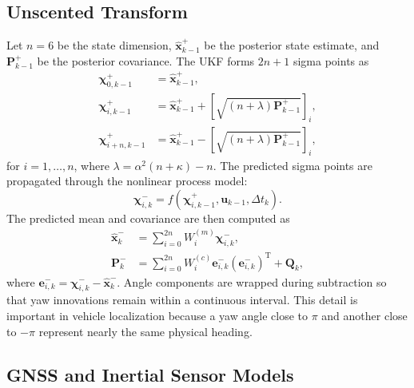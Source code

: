 \documentclass[conference]{IEEEtran}
\begin{document}
\subsection{Unscented Transform}

Let $n=6$ be the state dimension, $\hat{\mathbf{x}}_{k-1}^{+}$ be the posterior state estimate, and $\mathbf{P}_{k-1}^{+}$ be the posterior covariance. The UKF forms $2n+1$ sigma points as
\begin{align}
\boldsymbol{\chi}_{0,k-1}^{+} &= \hat{\mathbf{x}}_{k-1}^{+},
\label{eq:sigma0}\\
\boldsymbol{\chi}_{i,k-1}^{+} &= \hat{\mathbf{x}}_{k-1}^{+}
+ \left[\sqrt{(n+\lambda)\mathbf{P}_{k-1}^{+}}\right]_i,
\label{eq:sigmaplus}\\
\boldsymbol{\chi}_{i+n,k-1}^{+} &= \hat{\mathbf{x}}_{k-1}^{+}
- \left[\sqrt{(n+\lambda)\mathbf{P}_{k-1}^{+}}\right]_i,
\label{eq:sigmaminus}
\end{align}
for $i=1,\ldots,n$, where $\lambda=\alpha^2(n+\kappa)-n$. The predicted sigma points are propagated through the nonlinear process model:
\begin{equation}
\boldsymbol{\chi}_{i,k}^{-}=f(\boldsymbol{\chi}_{i,k-1}^{+},\mathbf{u}_{k-1},\Delta t_k).
\label{eq:sigma_predict}
\end{equation}
The predicted mean and covariance are then computed as
\begin{align}
\hat{\mathbf{x}}_k^{-} &= \sum_{i=0}^{2n} W_i^{(m)}\boldsymbol{\chi}_{i,k}^{-},
\label{eq:ukf_pred_mean}\\
\mathbf{P}_k^{-} &= \sum_{i=0}^{2n} W_i^{(c)}
\mathbf{e}_{i,k}^{-}(\mathbf{e}_{i,k}^{-})^{\mathrm{T}} + \mathbf{Q}_k,
\label{eq:ukf_pred_cov}
\end{align}
where $\mathbf{e}_{i,k}^{-}=\boldsymbol{\chi}_{i,k}^{-}-\hat{\mathbf{x}}_k^{-}$. Angle components are wrapped during subtraction so that yaw innovations remain within a continuous interval. This detail is important in vehicle localization because a yaw angle close to $\pi$ and another close to $-\pi$ represent nearly the same physical heading.

\subsection{GNSS and Inertial Sensor Models}
\end{document}
